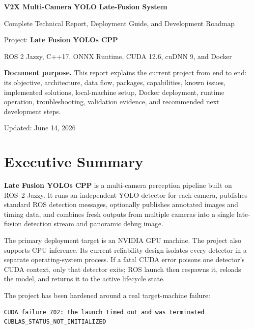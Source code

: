 \documentclass[11pt,a4paper]{article}
\newcommand{\project}{\textbf{Late Fusion YOLOs CPP}}
\newcommand{\ros}{ROS~2 Jazzy}
\begin{document}
\begin{titlepage}
  \centering
  \vspace*{2.0cm}
  {\Huge\bfseries V2X Multi-Camera YOLO Late-Fusion System\par}
  \vspace{0.6cm}
  {\LARGE Complete Technical Report, Deployment Guide, and Development Roadmap\par}
  \vspace{1.5cm}
  {\Large Project: \project\par}
  \vspace{0.4cm}
  {\large ROS 2 Jazzy, C++17, ONNX Runtime, CUDA 12.6, cuDNN 9, and Docker\par}
  \vfill
  \begin{minipage}{0.88\textwidth}
    \textbf{Document purpose.} This report explains the current project from end to end: its objective, architecture, data flow, packages, capabilities, known issues, implemented solutions, local-machine setup, Docker deployment, runtime operation, troubleshooting, validation evidence, and recommended next development steps.
  \end{minipage}
  \vfill
  {\large Updated: June 14, 2026\par}
\end{titlepage}

\tableofcontents
\newpage

\section{Executive Summary}

\project{} is a multi-camera perception pipeline built on \ros. It runs an independent YOLO detector for each camera, publishes standard ROS detection messages, optionally publishes annotated images and timing data, and combines fresh outputs from multiple cameras into a single late-fusion detection stream and panoramic debug image.

The primary deployment target is an NVIDIA GPU machine. The project also supports CPU inference. Its current reliability design isolates every detector in a separate operating-system process. If a fatal CUDA error poisons one detector's CUDA context, only that detector exits; ROS launch then respawns it, reloads the model, and returns it to the active lifecycle state.

The project has been hardened around a real target-machine failure:

\begin{lstlisting}
CUDA failure 702: the launch timed out and was terminated
CUBLAS_STATUS_NOT_INITIALIZED
\end{lstlisting}
\end{document}
